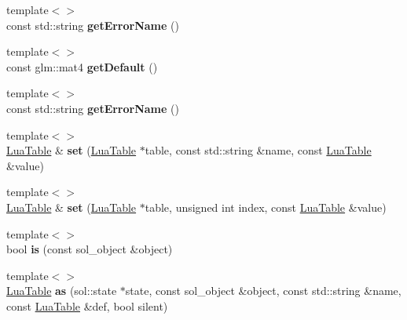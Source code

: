 \begin{DoxyCompactItemize}
{\footnotesize template$<$$>$ }\\const std\+::string {\bfseries get\+Error\+Name} ()
\item 
\mbox{\label{classTarbora_1_1LuaType_a08a065e61c06f3825f970008297e0782}} 
{\footnotesize template$<$$>$ }\\const glm\+::mat4 {\bfseries get\+Default} ()
\item 
\mbox{\label{classTarbora_1_1LuaType_aa5130b088aa9e55367c86ce56db32be1}} 
{\footnotesize template$<$$>$ }\\const std\+::string {\bfseries get\+Error\+Name} ()
\item 
\mbox{\label{classTarbora_1_1LuaType_a04c55f7dbce07142f46c91f3f90c6263}} 
{\footnotesize template$<$$>$ }\\\hyperlink{classTarbora_1_1LuaTable}{Lua\+Table} \& {\bfseries set} (\hyperlink{classTarbora_1_1LuaTable}{Lua\+Table} $\ast$table, const std\+::string \&name, const \hyperlink{classTarbora_1_1LuaTable}{Lua\+Table} \&value)
\item 
\mbox{\label{classTarbora_1_1LuaType_ad9fc2a5ee83e47f79d721e333e29dc4f}} 
{\footnotesize template$<$$>$ }\\\hyperlink{classTarbora_1_1LuaTable}{Lua\+Table} \& {\bfseries set} (\hyperlink{classTarbora_1_1LuaTable}{Lua\+Table} $\ast$table, unsigned int index, const \hyperlink{classTarbora_1_1LuaTable}{Lua\+Table} \&value)
\item 
\mbox{\label{classTarbora_1_1LuaType_a56d5f7984ebbafdcef2e07ae331207dd}} 
{\footnotesize template$<$$>$ }\\bool {\bfseries is} (const sol\+\_\+object \&object)
\item 
\mbox{\label{classTarbora_1_1LuaType_ac6ff9579a820e0a0f3229303927f6a35}} 
{\footnotesize template$<$$>$ }\\\hyperlink{classTarbora_1_1LuaTable}{Lua\+Table} {\bfseries as} (sol\+::state $\ast$state, const sol\+\_\+object \&object, const std\+::string \&name, const \hyperlink{classTarbora_1_1LuaTable}{Lua\+Table} \&def, bool silent)
\item 
\mbox{\label{classTarbora_1_1LuaType_a714457bde95f53440ff58a53a3414b1d}} 

\end{DoxyCompactItemize}
